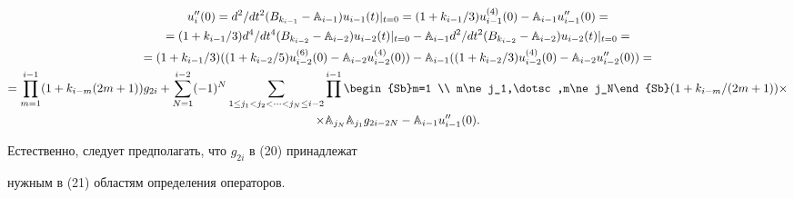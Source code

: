 \begin{multline} 


u''_i(0)=d^2/dt^2(B_{k_{i-1}}-\Bbb A_{i-1})u_{i-1}(t)|_{t=0}= 


(1+k_{i-1}/3)u^{(4)}_{i-1}(0)-\Bbb A_{i-1}u''_{i-1}(0)= \\ 


% 


= (1+k_{i-1}/3)d^4/dt^4(B_{k_{i-2}}-\Bbb A_{i-2})u_{i-2}(t)|_{t=0}- 


\Bbb A_{i-1}d^2/dt^2(B_{k_{i-2}}-\Bbb A_{i-2})u_{i-2}(t)|_{t=0}= \\ 


% 


=(1+k_{i-1}/3)((1+k_{i-2}/5)u^{(6)}_{i-2}(0)- 


\Bbb A_{i-2}u^{(4)}_{i-2}(0))-\Bbb A_{i-1} 


((1+k_{i-2}/3)u^{(4)}_{i-2}(0)-\Bbb A_{i-2}u''_{i-2}(0))= \\ 


% 


=\prod^{i-1}_{m=1}(1+k_{i-m}(2m+1))g_{2i}+\sum^{i-2}_{N=1} 


(-1)^N\sum_{1\le j_1<j_2<\dotsb<j_N\le i-2} 


\prod^{i-1}\begin{Sb}m=1 \\ m\ne j_1,\dotsc,m\ne j_N\end{Sb} 


(1+k_{i-m}/(2m+1))\times \\


%


\times \Bbb A_{j_N}\Bbb A_{j_1}g_{2i-2N}- 


\Bbb A_{i-1}u''_{i-1}(0). 


\end{multline} 


 


Естественно, следует предполагать, что $g_{2i}$ в (20) принадлежат 


нужным в (21) областям определения операторов. 


 


